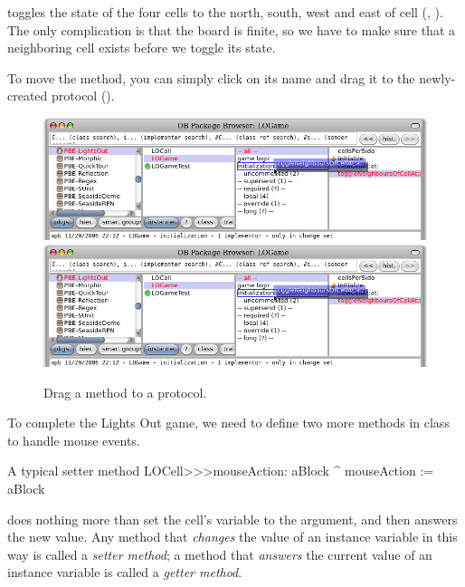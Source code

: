 \documentclass[a4paper,10pt,twoside]{book}
\begin{document}
 toggles the state of the four cells to the north, south, west and east of cell (, ).  The only complication is that the board is finite, so we have to make sure that a neighboring cell exists before we toggle its state.

To move the method, you can simply click on its name and drag it to the newly-created protocol ().

\begin{figure}[htbp]
   \centering
   \ifluluelse
		{\includegraphics[width=\textwidth]{DragMethod} }
		{\includegraphics[scale=0.7]{DragMethod} }
   \caption{Drag a method to a protocol.}
\end{figure}

To complete the Lights Out game, we need to define two more methods in class  to handle mouse events.
\begin{method}[mouseAction:]{A typical setter method}
LOCell>>>mouseAction: aBlock
   ^ mouseAction := aBlock
\end{method}

 does nothing more than set the cell's  variable to the argument, and then answers the new value.
Any method that \emph{changes} the value of an instance variable in this way is called a \emph{setter method}; a method that \emph{answers} the current value of an instance variable is called a \emph{getter method}.
\end{document}
